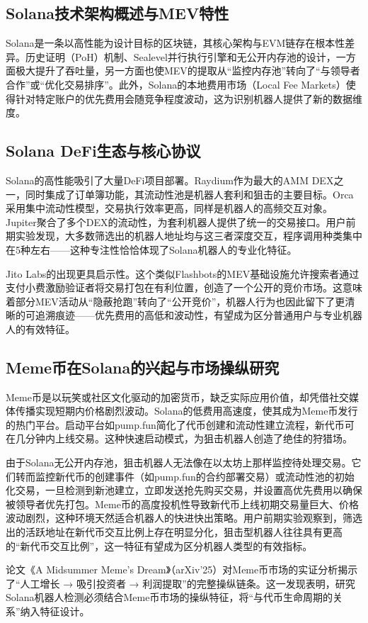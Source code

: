 \subsection{Solana技术架构概述与MEV特性}

\par Solana是一条以高性能为设计目标的区块链，其核心架构与EVM链存在根本性差异。历史证明（PoH）机制、Sealevel并行执行引擎和无公开内存池的设计，一方面极大提升了吞吐量，另一方面也使MEV的提取从“监控内存池”转向了“与领导者合作”或“优化交易排序”。此外，Solana的本地费用市场（Local Fee Markets）使得针对特定账户的优先费用会随竞争程度波动，这为识别机器人提供了新的数据维度。


\subsection{Solana DeFi生态与核心协议}

\par Solana的高性能吸引了大量DeFi项目部署。Raydium作为最大的AMM DEX之一，同时集成了订单簿功能，其流动性池是机器人套利和狙击的主要目标。Orca采用集中流动性模型，交易执行效率更高，同样是机器人的高频交互对象。Jupiter聚合了多个DEX的流动性，为套利机器人提供了统一的交易接口。用户前期实验发现，大多数筛选出的机器人地址均与这三者深度交互，程序调用种类集中在5种左右——这种专注性恰恰体现了Solana机器人的专业化特征。
\par Jito Labs的出现更具启示性。这个类似Flashbots的MEV基础设施允许搜索者通过支付小费激励验证者将交易打包在有利位置，创造了一个公开的竞价市场。这意味着部分MEV活动从“隐蔽抢跑”转向了“公开竞价”，机器人行为也因此留下了更清晰的可追溯痕迹——优先费用的高低和波动性，有望成为区分普通用户与专业机器人的有效特征。

\subsection{Meme币在Solana的兴起与市场操纵研究}

\par Meme币是以玩笑或社区文化驱动的加密货币，缺乏实际应用价值，却凭借社交媒体传播实现短期内价格剧烈波动。Solana的低费用高速度，使其成为Meme币发行的热门平台。启动平台如pump.fun简化了代币创建和流动性建立流程，新代币可在几分钟内上线交易。这种快速启动模式，为狙击机器人创造了绝佳的狩猎场。
\par 由于Solana无公开内存池，狙击机器人无法像在以太坊上那样监控待处理交易。它们转而监控新代币的创建事件（如pump.fun的合约部署交易）或流动性池的初始化交易，一旦检测到新池建立，立即发送抢先购买交易，并设置高优先费用以确保被领导者优先打包。Meme币的高度投机性导致新代币上线初期交易量巨大、价格波动剧烈，这种环境天然适合机器人的快进快出策略。用户前期实验观察到，筛选出的活跃地址在新代币交互比例上存在明显分化，狙击型机器人往往具有更高的“新代币交互比例”，这一特征有望成为区分机器人类型的有效指标。
\par 论文《A Midsummer Meme's Dream》（arXiv'25）对Meme币市场的实证分析揭示了“人工增长 → 吸引投资者 → 利润提取”的完整操纵链条。这一发现表明，研究Solana机器人检测必须结合Meme币市场的操纵特征，将“与代币生命周期的关系”纳入特征设计。



